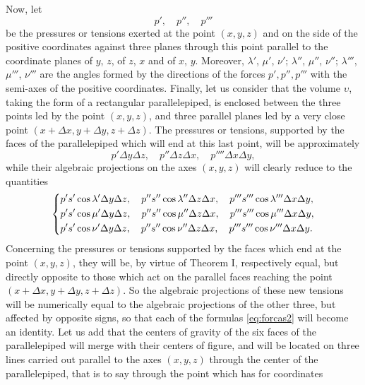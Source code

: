 \documentclass[leqno,openright,smallroyalvopaper,8pt,twoside,showtrims]{memoir}
\begin{document}
Now, let 
\begin{equation}
p',\quad p'',\quad p'''
\end{equation}
be the pressures or tensions exerted at the point $(x,y,z)$ and on the side of the positive coordinates against three planes through this point parallel to the coordinate planes of $y$, $z$, of $z$, $x$ and of $x$, $y$. Moreover, $\lambda'$, $\mu'$, $\nu'$; $\lambda''$, $\mu''$, $\nu''$; $\lambda'''$, $\mu'''$, $\nu'''$ are the angles formed by the directions
of the forces $p', p'',p'''$ with the semi-axes of the positive coordinates. Finally, let us consider that the volume $\upsilon$, taking the form of a rectangular parallelepiped, is enclosed between the three points led by the point $(x, y, z)$, and three parallel planes led by a very close point $(x+\Delta x, y+\Delta y, z+\Delta z)$. The pressures or tensions, supported by the faces of the parallelepiped which will end at this last point, will be approximately
\begin{equation}
p'\Delta y\Delta z,\quad p''\Delta z\Delta x,\quad p''''\Delta x\Delta y,
\end{equation}
while their algebraic projections on the axes $(x,y,z)$ will clearly reduce to the quantities
\begin{equation}
   \begin{dcases}
       p's'\cos\lambda'\Delta y\Delta z,\quad p''s''\cos\lambda''\Delta z\Delta x,\quad p'''s'''\cos\lambda'''\Delta x\Delta y,\\
       p's'\cos\mu'\Delta y\Delta z,\quad p''s''\cos\mu''\Delta z\Delta x,\quad p'''s'''\cos\mu'''\Delta x\Delta y,\\
       p's'\cos\nu'\Delta y\Delta z,\quad p''s''\cos\nu''\Delta z\Delta x,\quad p'''s'''\cos\nu'''\Delta x\Delta y.
   \end{dcases}
 \end{equation}
Concerning the pressures or tensions supported by the faces which end at the point $(x, y, z)$, they will be, by virtue of Theorem I, respectively equal, but directly opposite to those which act on the parallel faces reaching the point $(x+\Delta x, y+\Delta y, z+\Delta z)$. So the algebraic projections of these new tensions will be numerically equal to the algebraic projections of the other three, but affected by opposite signs, so that each of the formulas \eqref{eq:forcas2} will become an identity. Let us add that the centers of gravity of the six faces of the parallelepiped will merge with their centers of figure, and will be located on three lines carried out parallel to the axes $(x, y, z)$ through the center of the parallelepiped, that is to say through the point which has for coordinates
\end{document}
